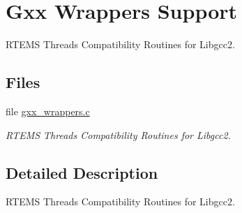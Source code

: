 \hypertarget{group__GxxWrappersSupport}{}\section{Gxx Wrappers Support}
\label{group__GxxWrappersSupport}


R\+T\+E\+MS Threads Compatibility Routines for Libgcc2.  


\subsection*{Files}
\begin{DoxyCompactItemize}
\item 
file \mbox{\hyperlink{gxx__wrappers_8c}{gxx\+\_\+wrappers.\+c}}
\begin{DoxyCompactList}\small\item\em R\+T\+E\+MS Threads Compatibility Routines for Libgcc2. \end{DoxyCompactList}\end{DoxyCompactItemize}


\subsection{Detailed Description}
R\+T\+E\+MS Threads Compatibility Routines for Libgcc2. 

